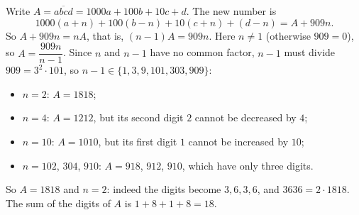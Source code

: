 Write $A=\overline{abcd}=1000a+100b+10c+d$. The new number is
\[1000(a+n)+100(b-n)+10(c+n)+(d-n)=A+909n.\]
So $A+909n=nA$, that is, $(n-1)A=909n$. Here $n\ne1$ (otherwise $909=0$), so $A=\dfrac{909n}{n-1}$. Since $n$ and $n-1$ have no common factor, $n-1$ must divide $909=3^2\cdot101$, so $n-1\in\{1,3,9,101,303,909\}$:
\begin{itemize}
\item $n=2$: $A=1818$;
\item $n=4$: $A=1212$, but its second digit $2$ cannot be decreased by $4$;
\item $n=10$: $A=1010$, but its first digit $1$ cannot be increased by $10$;
\item $n=102$, $304$, $910$: $A=918$, $912$, $910$, which have only three digits.
\end{itemize}
So $A=1818$ and $n=2$: indeed the digits become $3,6,3,6$, and $3636=2\cdot1818$. The sum of the digits of $A$ is $1+8+1+8=\boxed{18}$.
